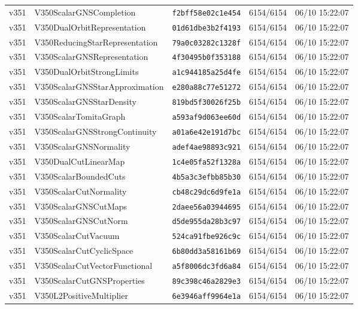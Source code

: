 \documentclass[11pt]{article}
\theoremstyle{definition}\newtheorem{deriv}{Derivation}
\begin{document}
{\begin{longtable}{@{}lllll@{}}
v351 & V350ScalarGNSCompletion & \texttt{f2bff58e02c1e454} & 6154/6154 & 06/10 15:22:07 \\
v351 & V350DualOrbitRepresentation & \texttt{01d61dbe3b2f4193} & 6154/6154 & 06/10 15:22:07 \\
v351 & V350ReducingStarRepresentation & \texttt{79a0c03282c1328f} & 6154/6154 & 06/10 15:22:07 \\
v351 & V350ScalarGNSRepresentation & \texttt{4f30495b0f353188} & 6154/6154 & 06/10 15:22:07 \\
v351 & V350DualOrbitStrongLimits & \texttt{a1c944185a25d4fe} & 6154/6154 & 06/10 15:22:07 \\
v351 & V350ScalarGNSStarApproximation & \texttt{e280a88c77e51272} & 6154/6154 & 06/10 15:22:07 \\
v351 & V350ScalarGNSStarDensity & \texttt{819bd5f30026f25b} & 6154/6154 & 06/10 15:22:07 \\
v351 & V350ScalarTomitaGraph & \texttt{a593af9d063ee60d} & 6154/6154 & 06/10 15:22:07 \\
v351 & V350ScalarGNSStrongContinuity & \texttt{a01a6e42e191d7bc} & 6154/6154 & 06/10 15:22:07 \\
v351 & V350ScalarGNSNormality & \texttt{adef4ae98893c921} & 6154/6154 & 06/10 15:22:07 \\
v351 & V350DualCutLinearMap & \texttt{1c4e05fa52f1328a} & 6154/6154 & 06/10 15:22:07 \\
v351 & V350ScalarBoundedCuts & \texttt{4b5a3c3efbb85b30} & 6154/6154 & 06/10 15:22:07 \\
v351 & V350ScalarCutNormality & \texttt{cb48c29dc6d9fe1a} & 6154/6154 & 06/10 15:22:07 \\
v351 & V350ScalarGNSCutMaps & \texttt{2daee56a03944695} & 6154/6154 & 06/10 15:22:07 \\
v351 & V350ScalarGNSCutNorm & \texttt{d5de955da28b3c97} & 6154/6154 & 06/10 15:22:07 \\
v351 & V350ScalarCutVacuum & \texttt{524ca91fbe926c9c} & 6154/6154 & 06/10 15:22:07 \\
v351 & V350ScalarCutCyclicSpace & \texttt{6b80dd3a58161b69} & 6154/6154 & 06/10 15:22:07 \\
v351 & V350ScalarCutVectorFunctional & \texttt{a5f8006dc3fd6a84} & 6154/6154 & 06/10 15:22:07 \\
v351 & V350ScalarCutGNSProperties & \texttt{89c398c46a2829e3} & 6154/6154 & 06/10 15:22:07 \\
v351 & V350L2PositiveMultiplier & \texttt{6e3946aff9964e1a} & 6154/6154 & 06/10 15:22:07 \\

\end{longtable}}
\end{document}

